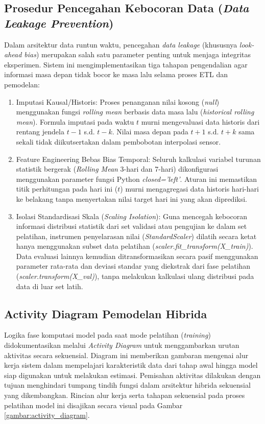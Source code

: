 \subsection{Prosedur Pencegahan Kebocoran Data (\textit{Data Leakage Prevention})}
Dalam arsitektur data runtun waktu, pencegahan \textit{data leakage} (khususnya \textit{look-ahead bias}) merupakan salah satu parameter penting untuk menjaga integritas eksperimen. Sistem ini mengimplementasikan tiga tahapan pengendalian agar informasi masa depan tidak bocor ke masa lalu selama proses ETL dan pemodelan:

\begin{enumerate}
    \item {Imputasi Kausal/Historis:} Proses penanganan nilai kosong (\textit{null}) menggunakan fungsi \textit{rolling mean} berbasis data masa lalu (\textit{historical rolling mean}). Formula imputasi pada waktu $t$ murni mengevaluasi data historis dari rentang jendela $t-1$ s.d. $t-k$. Nilai masa depan pada $t+1$ s.d. $t+k$ sama sekali tidak diikutsertakan dalam pembobotan interpolasi sensor.
    \item {Feature Engineering Bebas Bias Temporal:} Seluruh kalkulasi variabel turunan statistik bergerak (\textit{Rolling Mean} 3-hari dan 7-hari) dikonfigurasi menggunakan parameter fungsi Python \textit{closed='left'}. Aturan ini memastikan titik perhitungan pada hari ini ($t$) murni mengagregasi data historis hari-hari ke belakang tanpa menyertakan nilai target hari ini yang akan diprediksi.
    \item {Isolasi Standardisasi Skala (\textit{Scaling Isolation}):} Guna mencegah kebocoran informasi distribusi statistik dari set validasi atau pengujian ke dalam set pelatihan, instrumen penyelarasan nilai (\textit{StandardScaler}) dilatih secara ketat hanya menggunakan subset data pelatihan (\textit{scaler.fit\_transform(X\_train)}). Data evaluasi lainnya kemudian ditransformasikan secara pasif menggunakan parameter rata-rata dan deviasi standar yang diekstrak dari fase pelatihan (\textit{scaler.transform(X\_val)}), tanpa melakukan kalkulasi ulang distribusi pada data di luar set latih.
\end{enumerate}

\subsection{Activity Diagram Pemodelan Hibrida}

Logika fase komputasi model pada saat mode pelatihan (\textit{training}) didokumentasikan melalui \textit{Activity Diagram} untuk menggambarkan urutan aktivitas secara sekuensial. Diagram ini memberikan gambaran mengenai alur kerja sistem dalam mempelajari karakteristik data dari tahap awal hingga model siap digunakan untuk melakukan estimasi. Pemisahan aktivitas dilakukan dengan tujuan menghindari tumpang tindih fungsi dalam arsitektur hibrida sekuensial yang dikembangkan. Rincian alur kerja serta tahapan sekuensial pada proses pelatihan model ini disajikan secara visual pada Gambar \ref{gambar:activity_diagram}.

